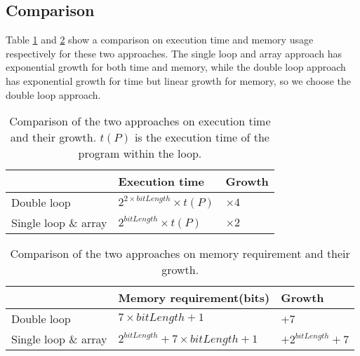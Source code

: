 \subsection{Comparison}
Table \ref{tbl:execTime} and \ref{tbl:memReq} show a comparison on execution time and memory usage respectively for these two approaches. The single loop and array approach has exponential growth for both time and memory, while the double loop approach has exponential growth for time but linear growth for memory, so we choose the double loop approach. 

\begin{table}
\centering
\begin{tabular}{|l|l|l|}
\hline
 & Execution time & Growth  \\ \hline
Double loop & $2^{2 \times bitLength} \times t(P)$ & $\times 4$  \\ \hline
Single loop \& array & $2^{bitLength} \times t(P)$ & $\times 2$		\\ \hline
\end{tabular}
\caption{Comparison of the two approaches on execution time and their growth. $t(P)$ is the execution time of the program within the loop.}
\label{tbl:execTime}
\end{table}


\begin{table}
\centering
\begin{tabular}{|l|l|l|}
\hline
 & Memory requirement(bits) & Growth \\ \hline
Double loop & $7 \times bitLength + 1$ & +7 \\ \hline
Single loop \& array & $2^{bitLength} + 7 \times bitLength + 1$ & $+ 2^{bitLength} + 7$ \\ \hline
\end{tabular}
\caption{Comparison of the two approaches on memory requirement and their growth.}
\label{tbl:memReq}
\end{table}
